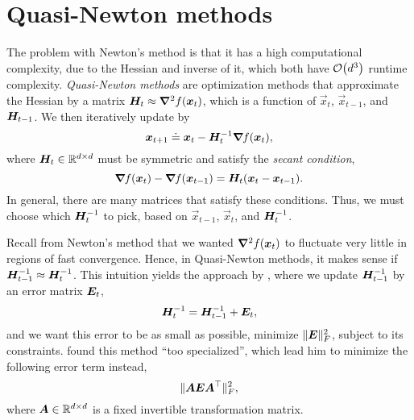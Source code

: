 \section{Quasi-Newton methods}

The problem with Newton's method is that it has a high computational complexity, due to the Hessian
and inverse of it, which both have $\bigo{d^3}$ runtime complexity. \textit{Quasi-Newton methods}
are optimization methods that approximate the Hessian by a matrix $\bm{H}_t \approx
    \bm{\nabla}^2_{\! } f(\bm{x}_t)$, which is a function of $\vec{x}_t$, $\vec{x}_{t-1}$, and $\bm{H}_{t-1}$.
We then iteratively update by \[
    \bm{x}_{t+1} \doteq \bm{x}_t - \bm{H}^{-1}_t \bm{\nabla}_{\! } f(\bm{x}_t),
\]
where $\bm{H}_t \in \mathbb{R}^{d\times d}$ must be symmetric and satisfy the \textit{secant condition}, \[
    \bm{\nabla}_{\! } f(\bm{x}_t) - \bm{\nabla}_{\! } f(\bm{x}_{t-1}) = \bm{H}_t (\bm{x}_t - \bm{x}_{t-1}).
\]
In general, there are many matrices that satisfy these conditions. Thus, we must choose which
$\bm{H}^{-1}_t$ to pick, based on $\vec{x}_{t-1}$, $\vec{x}_t$, and
$\bm{H}^{-1}_t$.

Recall from Newton's method that we wanted $\bm{\nabla}^2_{\! } f(\bm{x}_t)$ to fluctuate very little in
regions of fast convergence. Hence, in Quasi-Newton methods, it makes sense if $\bm{H}^{-1}_{t-1}
    \approx \bm{H}^{-1}_t$. This intuition yields the approach by \cite{greenstadt1970variations},
where we update $\bm{H}^{-1}_{t-1}$ by an error matrix $\bm{E}_t$, \[
    \bm{H}^{-1}_t = \bm{H}^{-1}_{t-1} + \bm{E}_t,
\]
and we want this error to be as small as possible, \ie minimize $\| \bm{E} \|_F^2$, subject to its
constraints. \cite{greenstadt1970variations} found this method ``too specialized'', which lead him
to minimize the following error term instead, \[
    \| \bm{A} \bm{E} \bm{A}^\top \|_F^2,
\]
where $\bm{A} \in \mathbb{R}^{d\times d}$ is a fixed invertible transformation matrix.

